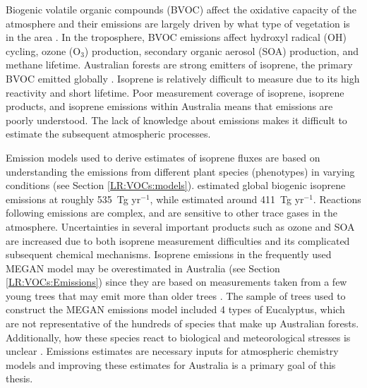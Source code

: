 \documentclass[acp, manuscript]{copernicus}
\newcommand{\parencite}{\citep}
\newcommand{\textcite}{\citet}
\newcommand{\tgpyr}{~Tg yr$^{-1}$}
\begin{document}
Biogenic volatile organic compounds (BVOC) affect the oxidative capacity of the atmosphere and their emissions are largely driven by what type of vegetation is in the area \parencite{Kefauver2014}.
In the troposphere, BVOC emissions affect hydroxyl radical (OH) cycling, ozone (O$_3$) production, secondary organic aerosol (SOA) production, and methane lifetime.
Australian forests are strong emitters of isoprene, the primary BVOC emitted globally \parencite{Guenther2006,Messina2016}. %
Isoprene is relatively difficult to measure due to its high reactivity and short lifetime.
Poor measurement coverage of isoprene, isoprene products, and isoprene emissions within Australia means that emissions are poorly understood.
The lack of knowledge about emissions makes it difficult to estimate the subsequent atmospheric processes. 


Emission models used to derive estimates of isoprene fluxes are based on understanding the emissions from different plant species (phenotypes) in varying conditions (see Section \ref{LR:VOCs:models}).
\textcite{Guenther2012} estimated global biogenic isoprene emissions at roughly 535\tgpyr, while \textcite{Sindelarova2014} estimated around 411\tgpyr.
Reactions following emissions are complex, and are sensitive to other trace gases in the atmosphere.
Uncertainties in several important products such as ozone and SOA are increased due to both isoprene measurement difficulties and its complicated subsequent chemical mechanisms.
Isoprene emissions in the frequently used MEGAN model may be overestimated in Australia (see Section \ref{LR:VOCs:Emissions}) since they are based on measurements taken from a few young trees \parencite{Winters2009} that may emit more than older trees \parencite{Emmerson2016}.
The sample of trees used to construct the MEGAN emissions model included 4 types of Eucalyptus, which are not representative of the hundreds of species that make up Australian forests.
Additionally, how these species react to biological and meteorological stresses is unclear \parencite{Winters2009, FortemsCheiney2012}.
Emissions estimates are necessary inputs for atmospheric chemistry models and improving these estimates for Australia is a primary goal of this thesis.
\end{document}
